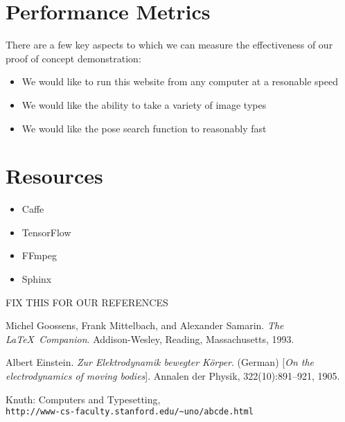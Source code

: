 \documentclass[a4paper, 12pt]{article}
\begin{document}
\section{Performance Metrics}
There are a few key aspects to which we can measure the effectiveness of our proof of concept demonstration:
\begin{itemize}
    \item We would like to run this website from any computer at a resonable speed
    \item We would like the ability to take a variety of image types
    \item We would like the pose search function to reasonably fast 
\end{itemize}

\section{Resources}
\begin{itemize}
    \item Caffe
    \item TensorFlow
    \item FFmpeg
    \item Sphinx 
\end{itemize}

{FIX THIS FOR OUR REFERENCES}
\begin{thebibliography}{9}
Michel Goossens, Frank Mittelbach, and Alexander Samarin. 
\textit{The \LaTeX\ Companion}. 
Addison-Wesley, Reading, Massachusetts, 1993.
 
Albert Einstein. 
\textit{Zur Elektrodynamik bewegter K{\"o}rper}. (German) 
[\textit{On the electrodynamics of moving bodies}]. 
Annalen der Physik, 322(10):891–921, 1905.
 
Knuth: Computers and Typesetting,
\\\texttt{http://www-cs-faculty.stanford.edu/\~{}uno/abcde.html}
\end{thebibliography}
\end{document}
